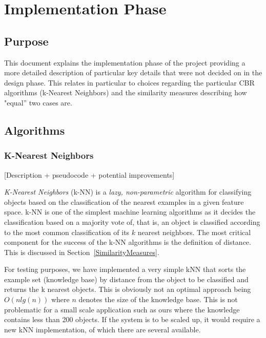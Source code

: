  

\chapter{Implementation Phase}\label{impl}

\minitoc

\section{Purpose}
This document explains the implementation phase of the
project providing a more detailed description of particular key
details that were not decided on in the design phase. This relates in
particular to choices regarding the particular CBR algorithms
(k-Nearest Neighbors) and the similarity measures describing how
"equal'' two cases are.

\section{Algorithms}

\subsection{K-Nearest Neighbors}

[Description + pseudocode + potential improvements]

\emph{K-Nearest Neighbors} (k-NN) is a \emph{lazy, non-parametric} algorithm for classifying objects based on the classification of the nearest examples in a given feature space. k-NN is one of the simplest machine learning algorithms as it decides the classification based on a majority vote of, that is, an object is classified according to the most common classification of its $k$ nearest neighbors. The most critical component for the success of the k-NN algorithms is the definition of distance. This is discussed in Section~\ref{SimilarityMeasures}. 

For testing purposes, we have implemented a very simple kNN that sorts the example set (knowledge base) by distance from the object to be classified and returns the k nearest objects. This is obviously not an optimal approach being $O(n lg(n))$ where $n$ denotes the size of the knowledge base. This is not problematic for a small scale application such as ours where the knowledge contains less than 200 objects. If the system is to be scaled up, it would require a new kNN implementation, of which there are several available.

